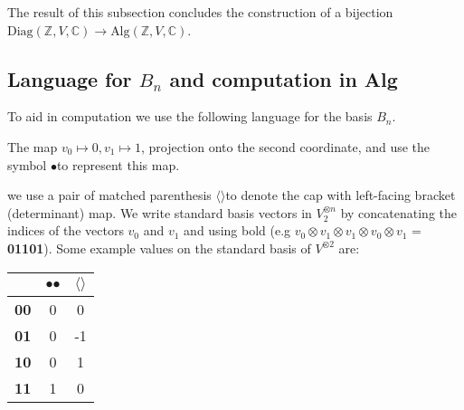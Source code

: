 \documentclass[11pt]{article} %
\newcommand{\lcap}{\boldmath$\langle$\unboldmath}
\newcommand{\rcap}{\boldmath$\rangle$\unboldmath}
\newcommand{\dotmap}{$\bullet$}
\begin{document}
\begin{tikzpicture}[scale = 0.75]











\end{tikzpicture}

The result of this subsection concludes the construction of a bijection $\text{Diag}({\mathbb{Z},V,\mathbb{C}}) \rightarrow \text{Alg}({\mathbb{Z},V,\mathbb{C}})$.


\subsection{Language for $B_n$ and computation in Alg}

To aid in computation we use the following language for the basis $B_n$.

The map $v_0 \mapsto 0, v_1 \mapsto 1$, projection onto the second coordinate, and use the symbol \dotmap\hspace{1.25mm}to represent this map.

we use a pair of matched parenthesis \lcap\rcap\hspace{1.25mm}to denote the cap with left-facing bracket (determinant) map. We write standard basis vectors in $V_2^{\otimes n}$ by concatenating the indices of the vectors $v_0$ and $v_1$ and using bold (e.g $v_0 \otimes v_1 \otimes v_1 \otimes v_0 \otimes v_1$ = \textbf{01101}). Some example values on the standard basis of $V^{\otimes 2}$ are:

\begin{center}
\begin{tabular}{| c | c | c |}
  \hline
   & \dotmap\dotmap & \lcap\rcap \\
  \hline			
  \textbf{00} & 0 & 0 \\
  \hline
  \textbf{01} & 0 & -1 \\
  \hline
  \textbf{10} & 0 & 1 \\
  \hline
  \textbf{11} & 1 & 0 \\
  \hline

\end{tabular}
\end{center}
\end{document}
